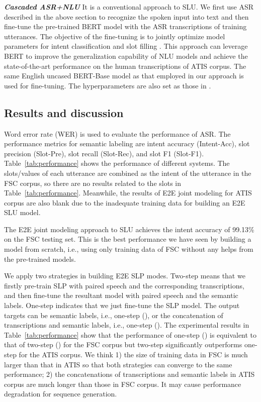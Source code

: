\documentclass{article}
\begin{document}
\textit{\textbf{Cascaded ASR+NLU}}  It is a conventional approach to SLU. We first use ASR described in the above section to recognize the spoken input into text and then fine-tune the pre-trained BERT model with the ASR transcriptions of training utterances. The objective of the fine-tuning is to jointly optimize model parameters for intent classification and slot filling \cite{DBLP:journals/corr/abs-1902-10909}. This approach can leverage BERT to improve the generalization capability of NLU models and achieve the state-of-the-art performance on the human transcriptions of ATIS corpus. The same English uncased BERT-Base model as that employed in our approach is used for fine-tuning. The hyperparameters are also set as those in \cite{DBLP:journals/corr/abs-1902-10909}.

\subsection{Results and discussion}
\label{ssec:restuls}
Word error rate (WER) is used to evaluate the performance of ASR. The performance metrics for semantic labeling are intent accuracy (Intent-Acc), slot precision (Slot-Pre), slot recall (Slot-Rec), and slot F1 (Slot-F1). Table~\ref{tab:performance} shows the performance of different systems. The slots/values of each utterance are combined as the intent of the utterance in the FSC corpus, so there are no results related to the slots in Table~\ref{tab:performance}. Meanwhile, the results of E2E joint modeling for ATIS corpus are also blank due to the inadequate training data for building an E2E SLU model. 

The E2E joint modeling approach to SLU achieves the intent accuracy of 99.13\% on the FSC testing set. This is the best performance we have seen by building a model from scratch, i.e., using only training data of FSC without any helps from the pre-trained models.

We apply two strategies in building E2E SLP modes. Two-step means that we firstly pre-train SLP with paired speech and the corresponding transcriptions, and then fine-tune the resultant model with paired speech and the semantic labels. One-step indicates that we just fine-tune the SLP model. The output targets can be semantic labels, i.e., one-step (), or the concatenation of transcriptions and semantic labels, i.e., one-step (). The experimental results in Table~\ref{tab:performance} show that the performance of one-step () is equivalent to that of two-step () for the FSC corpus but two-step significantly outperforms one-step for the ATIS corpus. We think 1) the size of training data in FSC is much larger than that in ATIS so that both strategies can converge to the same performance; 2) the concatenations of transcriptions and semantic labels in ATIS corpus are much longer than those in FSC corpus. It may cause performance degradation for sequence generation. 
\end{document}
